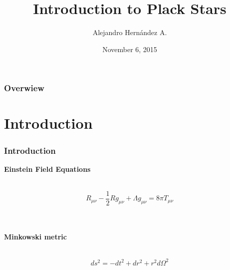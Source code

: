 \documentclass{beamer}
\title[Planck Stars]{Introduction to Plack Stars} %
\author[Hernández A.]{Alejandro Hernández A. } %
\institute[Uniandes] %
{
Universidad de los Andes, Bogotá, Colombia \\ %
}
\date{November 6, 2015} %
\begin{document}
\begin{frame}
\titlepage %
\end{frame}

\begin{frame}
\frametitle{Overwiew} %
\tableofcontents %
\end{frame}


\section{Introduction} %

\begin{frame}
\frametitle{Introduction}

\textbf{Einstein Field Equations} \\\

\begin{equation}
\label{field}
R_{\mu \nu} - \frac{1}{2} R g_{\mu \nu} + \Lambda g_{\mu \nu} = 8 \pi T_{\mu \nu}
\end{equation}

\
\\
\
\\

\textbf{Minkowski metric} \\\

\begin{equation}
\label{mink}
ds^2 = -dt^2 + dr^2 + r^2d\Omega ^2
\end{equation}


\end{frame}
\end{document}
